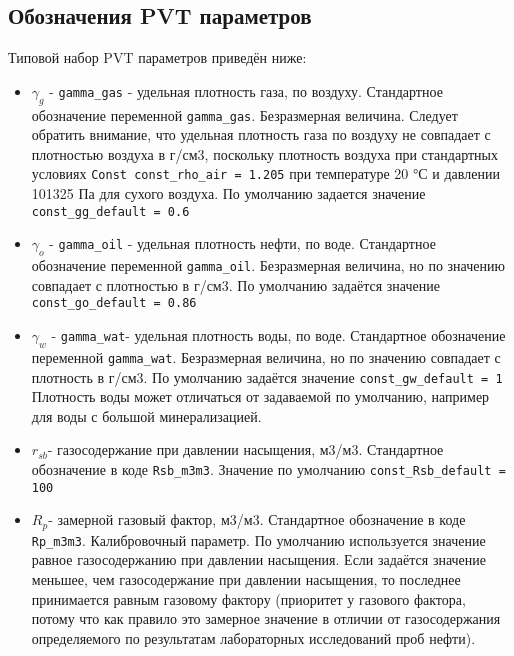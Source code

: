 \subsection{Обозначения PVT параметров}
Типовой набор PVT параметров приведён ниже:


\begin{itemize}
	
\item	$\gamma_g$  - \texttt{gamma_gas} - удельная плотность газа, по воздуху. Стандартное обозначение переменной \texttt{gamma_gas}. Безразмерная величина. Следует обратить внимание, что удельная плотность газа по воздуху не совпадает с плотностью воздуха в г/см3, поскольку плотность воздуха при стандартных условиях \texttt{Const const_rho_air = 1.205} при температуре 20 °С и давлении 101325 Па для сухого воздуха. По умолчанию задается значение \texttt{const_gg_default = 0.6}

\item $\gamma_o$  - \texttt{gamma_oil} - удельная плотность нефти, по воде. Стандартное обозначение переменной \texttt{gamma_oil}. Безразмерная величина, но по значению совпадает с плотностью в г/см3. По умолчанию задаётся значение \texttt{const_go_default = 0.86}

\item $\gamma_w$  - \texttt{gamma_wat}- удельная плотность воды, по воде. Стандартное обозначение переменной \texttt{gamma_wat}. Безразмерная величина, но по значению совпадает с плотность в г/см3. По умолчанию задаётся значение \texttt{const_gw_default = 1} Плотность воды может отличаться от задаваемой по умолчанию, например для воды с большой минерализацией.  

\item $r_{sb}$- газосодержание при давлении насыщения, м3/м3. Стандартное обозначение в коде \texttt{Rsb_m3m3}. Значение по умолчанию \texttt{const_Rsb_default = 100}

\item $R_p$-  замерной газовый фактор, м3/м3. Стандартное обозначение в коде \texttt{Rp_m3m3}. Калибровочный параметр. По умолчанию используется значение равное газосодержанию при давлении насыщения. Если задаётся значение меньшее, чем газосодержание при давлении насыщения, то последнее принимается равным газовому фактору (приоритет у газового фактора, потому что как правило это замерное значение в отличии от газосодержания определяемого по результатам лабораторных исследований проб нефти).


\end{itemize}
